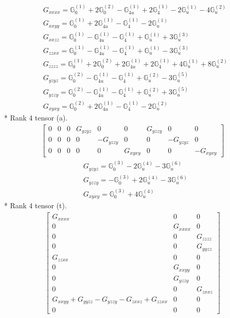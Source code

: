 \documentclass[fleqn,8pt,landscape]{jsarticle}
\begin{document}
\begin{align*}
& G_{xxxx} = \mathbb{G}_{0}^{(1)} + 2 \mathbb{G}_{0}^{(2)} - \mathbb{G}_{4u}^{(1)} + 2 \mathbb{G}_{4}^{(1)} - 2 \mathbb{G}_{u}^{(1)} - 4 \mathbb{G}_{u}^{(2)} \\
& G_{xxyy} = \mathbb{G}_{0}^{(1)} + 2 \mathbb{G}_{4u}^{(1)} - \mathbb{G}_{4}^{(1)} - 2 \mathbb{G}_{u}^{(1)} \\
& G_{xxzz} = \mathbb{G}_{0}^{(1)} - \mathbb{G}_{4u}^{(1)} - \mathbb{G}_{4}^{(1)} + \mathbb{G}_{u}^{(1)} + 3 \mathbb{G}_{u}^{(3)} \\
& G_{zzxx} = \mathbb{G}_{0}^{(1)} - \mathbb{G}_{4u}^{(1)} - \mathbb{G}_{4}^{(1)} + \mathbb{G}_{u}^{(1)} - 3 \mathbb{G}_{u}^{(3)} \\
& G_{zzzz} = \mathbb{G}_{0}^{(1)} + 2 \mathbb{G}_{0}^{(2)} + 2 \mathbb{G}_{4u}^{(1)} + 2 \mathbb{G}_{4}^{(1)} + 4 \mathbb{G}_{u}^{(1)} + 8 \mathbb{G}_{u}^{(2)} \\
& G_{yzyz} = \mathbb{G}_{0}^{(2)} - \mathbb{G}_{4u}^{(1)} - \mathbb{G}_{4}^{(1)} + \mathbb{G}_{u}^{(2)} - 3 \mathbb{G}_{u}^{(5)} \\
& G_{yzzy} = \mathbb{G}_{0}^{(2)} - \mathbb{G}_{4u}^{(1)} - \mathbb{G}_{4}^{(1)} + \mathbb{G}_{u}^{(2)} + 3 \mathbb{G}_{u}^{(5)} \\
& G_{xyxy} = \mathbb{G}_{0}^{(2)} + 2 \mathbb{G}_{4u}^{(1)} - \mathbb{G}_{4}^{(1)} - 2 \mathbb{G}_{u}^{(2)}
\end{align*}
* Rank 4 tensor (a).
\begin{align*}
\begin{bmatrix} 0 & 0 & 0 & G_{yzyz} & 0 & 0 & G_{yzzy} & 0 & 0 \\ 0 & 0 & 0 & 0 & - G_{yzzy} & 0 & 0 & - G_{yzyz} & 0 \\ 0 & 0 & 0 & 0 & 0 & G_{xyxy} & 0 & 0 & - G_{xyxy} \end{bmatrix}
\end{align*}
\begin{align*}
& G_{yzyz} = \mathbb{G}_{0}^{(3)} - 2 \mathbb{G}_{u}^{(4)} - 3 \mathbb{G}_{u}^{(6)} \\
& G_{yzzy} = - \mathbb{G}_{0}^{(3)} + 2 \mathbb{G}_{u}^{(4)} - 3 \mathbb{G}_{u}^{(6)} \\
& G_{xyxy} = \mathbb{G}_{0}^{(3)} + 4 \mathbb{G}_{u}^{(4)}
\end{align*}
* Rank 4 tensor (t).
\begin{align*}
\begin{bmatrix} G_{xxxx} & 0 & 0 \\ 0 & G_{xxxx} & 0 \\ 0 & 0 & G_{zzzz} \\ 0 & 0 & G_{yyzz} \\ G_{zzxx} & 0 & 0 \\ 0 & G_{xxyy} & 0 \\ 0 & G_{yzzy} & 0 \\ 0 & 0 & G_{zxxz} \\ G_{xxyy} + G_{yyzz} - G_{yzzy} - G_{zxxz} + G_{zzxx} & 0 & 0 \\ 0 & 0 & 0 \end{bmatrix}
\end{align*}
\end{document}
